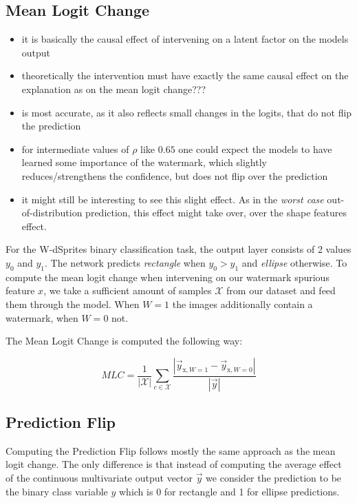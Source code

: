 \subsection{Mean Logit Change}
\begin{itemize}
    \item it is basically the causal effect of intervening on a latent factor on the models output
    \item theoretically the intervention must have exactly the same causal effect on the explanation as on the mean logit change???
    \item is most accurate, as it also reflects small changes in the logits, that do not flip the prediction
    \item for intermediate values of $\rho$ like $0.65$ one could expect the models to have learned some importance of the watermark, which slightly reduces/strengthens the confidence, but does not flip over the prediction
    \item it might still be interesting to see this slight effect. As in the \textit{worst case} out-of-distribution prediction, this effect might take over, over the shape features effect. 
\end{itemize}
For the W-dSprites binary classification task, the output layer consists of 2 values $y_0$ and $y_1$. The network predicts \textit{rectangle} when $y_0 > y_1$ and \textit{ellipse} otherwise. To compute the mean logit change when intervening on our watermark spurious feature $x$, we take a sufficient amount of samples $\mathcal{X}$ from our dataset and feed them through the model. When $W=1$ the images additionally contain a watermark, when $W=0$ not. 

The Mean Logit Change is computed the following way:

\begin{equation}
\displaystyle 
MLC =\frac{1}{|\mathcal{X}|} \sum_{c \in \mathcal{X}} \frac{|\vec{y}_{\mathrm{x}, W=1}- \vec{y}_{\mathrm{x}, W=0} |}{|\vec{y}|}
\end{equation}

\subsection{Prediction Flip}
Computing the Prediction Flip follows mostly the same approach as the mean logit change. The only difference is that instead of computing the average effect of the continuous multivariate output vector $\vec{y}$ we consider the prediction to be the binary class variable $y$ which is 0 for rectangle and 1 for ellipse predictions. 

